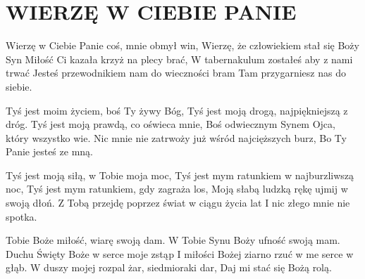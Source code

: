 \documentclass[../../../songbook.tex]{subfiles}
\begin{document}
\TabPositions{8cm} %
\section*{WIERZĘ W CIEBIE PANIE}
{}
\vspace{0.5cm}
Wierzę w Ciebie Panie coś, mnie obmył win,		 \newline
Wierzę, że człowiekiem stał się Boży Syn		 \newline
Miłość Ci kazała krzyż na plecy brać,			 \newline
W tabernakulum zostałeś aby z nami trwać 		 \newline
Jesteś przewodnikiem nam do wieczności bram 	 \newline
Tam przygarniesz nas do siebie.					 \newline

Tyś jest moim życiem, boś Ty żywy Bóg,			 \newline
Tyś jest moją drogą, najpiękniejszą z dróg.			 \newline
Tyś jest moją prawdą, co oświeca mnie,			 \newline
Boś odwiecznym Synem Ojca, który wszystko wie.			 \newline
Nic mnie nie zatrwoży już wśród najcięższych burz,			 \newline
Bo Ty Panie jesteś ze mną.			 \newline

Tyś jest moją siłą, w Tobie moja moc,			 \newline
Tyś jest mym ratunkiem w najburzliwszą noc,			 \newline
Tyś jest mym ratunkiem, gdy zagraża los,			 \newline
Moją słabą ludzką rękę ujmij w swoją dłoń.			 \newline
Z Tobą przejdę poprzez świat w ciągu życia lat			 \newline
I nic złego mnie nie spotka.			 \newline

Tobie Boże miłość, wiarę swoją dam.			 \newline
W Tobie Synu Boży ufność swoją mam.			 \newline
Duchu Święty Boże w serce moje zstąp			 \newline
I miłości Bożej ziarno rzuć w me serce w głąb.			 \newline
W duszy mojej rozpal żar, siedmioraki dar,			 \newline
Daj mi stać się Bożą rolą.			 \newline
\end{document}
